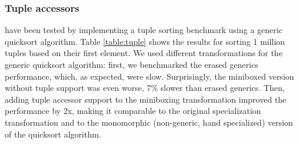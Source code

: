 \subsubsection*{Tuple accessors} have been tested by implementing a tuple sorting benchmark using a generic quicksort algorithm. Table \ref{table:tuple} shows the results for sorting 1 million tuples based on their first element. We used different transformations for the generic quicksort algorithm: first, we benchmarked the erased generics performance, which, as expected, were slow. Surprisingly, the miniboxed version without tuple support was even worse, 7\% slower than erased generics. Then, adding tuple accessor support to the miniboxing transformation improved the performance by 2x, making it comparable to the original specialization transformation and to the monomorphic (non-generic, hand specialized) version of the quicksort algorithm.
